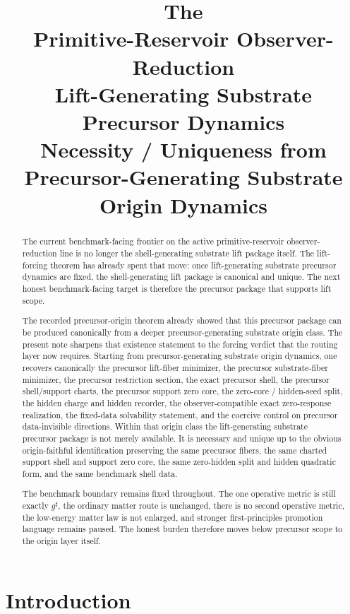 \documentclass[11pt]{article}
\title{\textbf{The \TheoryName{}}\\[0.4em]
\large Primitive-Reservoir Observer-Reduction\\
\large Lift-Generating Substrate Precursor Dynamics\\
\large Necessity / Uniqueness from\\
\large Precursor-Generating Substrate Origin Dynamics}
\author{}
\date{}
\newcommand{\CompletedMetric}{g^{\sharp}}
\begin{document}
\maketitle

\begin{abstract}
The current benchmark-facing frontier on the active primitive-reservoir observer-reduction line is no longer the shell-generating substrate lift package itself. The lift-forcing theorem has already spent that move: once lift-generating substrate precursor dynamics are fixed, the shell-generating lift package is canonical and unique. The next honest benchmark-facing target is therefore the precursor package that supports lift scope.

The recorded precursor-origin theorem already showed that this precursor package can be produced canonically from a deeper precursor-generating substrate origin class. The present note sharpens that existence statement to the forcing verdict that the routing layer now requires. Starting from precursor-generating substrate origin dynamics, one recovers canonically the precursor lift-fiber minimizer, the precursor substrate-fiber minimizer, the precursor restriction section, the exact precursor shell, the precursor shell/support charts, the precursor support zero core, the zero-core / hidden-seed split, the hidden charge and hidden recorder, the observer-compatible exact zero-response realization, the fixed-data solvability statement, and the coercive control on precursor data-invisible directions. Within that origin class the lift-generating substrate precursor package is not merely available. It is necessary and unique up to the obvious origin-faithful identification preserving the same precursor fibers, the same charted support shell and support zero core, the same zero-hidden split and hidden quadratic form, and the same benchmark shell data.

The benchmark boundary remains fixed throughout. The one operative metric is still exactly \(\CompletedMetric\), the ordinary matter route is unchanged, there is no second operative metric, the low-energy matter law is not enlarged, and stronger first-principles promotion language remains paused. The honest burden therefore moves below precursor scope to the origin layer itself.
\end{abstract}

\section{Introduction}
\end{document}
